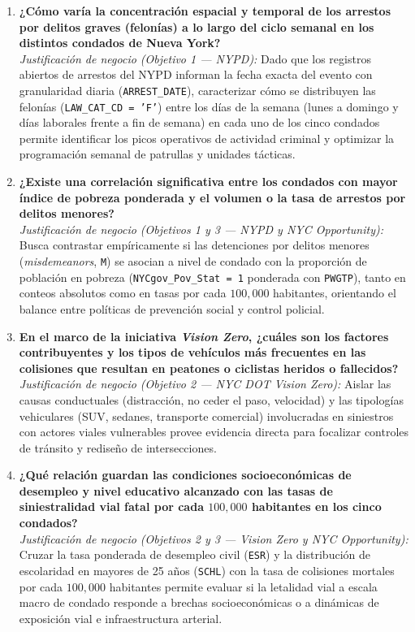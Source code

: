 \documentclass[11pt,a4paper]{article}
\begin{document}
\begin{enumerate}

    \item \textbf{¿Cómo varía la concentración espacial y temporal de los arrestos por delitos graves (felonías) a lo largo del ciclo semanal en los distintos condados de Nueva York?}\\
    \textit{Justificación de negocio (Objetivo 1 --- NYPD):} Dado que los registros abiertos de arrestos del NYPD informan la fecha exacta del evento con granularidad diaria (\texttt{ARREST\_DATE}), caracterizar cómo se distribuyen las felonías (\texttt{LAW\_CAT\_CD = 'F'}) entre los días de la semana (lunes a domingo y días laborales frente a fin de semana) en cada uno de los cinco condados permite identificar los picos operativos de actividad criminal y optimizar la programación semanal de patrullas y unidades tácticas.

    \item \textbf{¿Existe una correlación significativa entre los condados con mayor índice de pobreza ponderada y el volumen o la tasa de arrestos por delitos menores?}\\
    \textit{Justificación de negocio (Objetivos 1 y 3 --- NYPD y NYC Opportunity):} Busca contrastar empíricamente si las detenciones por delitos menores (\textit{misdemeanors}, \texttt{M}) se asocian a nivel de condado con la proporción de población en pobreza (\texttt{NYCgov\_Pov\_Stat = 1} ponderada con \texttt{PWGTP}), tanto en conteos absolutos como en tasas por cada $100,000$ habitantes, orientando el balance entre políticas de prevención social y control policial.

    \item \textbf{En el marco de la iniciativa \textit{Vision Zero}, ¿cuáles son los factores contribuyentes y los tipos de vehículos más frecuentes en las colisiones que resultan en peatones o ciclistas heridos o fallecidos?}\\
    \textit{Justificación de negocio (Objetivo 2 --- NYC DOT Vision Zero):} Aislar las causas conductuales (distracción, no ceder el paso, velocidad) y las tipologías vehiculares (SUV, sedanes, transporte comercial) involucradas en siniestros con actores viales vulnerables provee evidencia directa para focalizar controles de tránsito y rediseño de intersecciones.

    \item \textbf{¿Qué relación guardan las condiciones socioeconómicas de desempleo y nivel educativo alcanzado con las tasas de siniestralidad vial fatal por cada $100,000$ habitantes en los cinco condados?}\\
    \textit{Justificación de negocio (Objetivos 2 y 3 --- Vision Zero y NYC Opportunity):} Cruzar la tasa ponderada de desempleo civil (\texttt{ESR}) y la distribución de escolaridad en mayores de 25 años (\texttt{SCHL}) con la tasa de colisiones mortales por cada $100,000$ habitantes permite evaluar si la letalidad vial a escala macro de condado responde a brechas socioeconómicas o a dinámicas de exposición vial e infraestructura arterial.


\end{enumerate}
\end{document}

